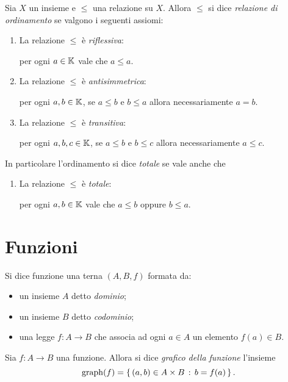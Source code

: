 \begin{definition}
    Sia $X$ un insieme e $\leq$ una relazione su $X$. Allora $\leq$ si dice \emph{relazione di ordinamento} se valgono i seguenti assiomi: \begin{enumerate}[label={(ORD\arabic*)}]
        \item La relazione $\leq$ è \emph{riflessiva}:
        
        per ogni $a \in \mathbb{K}$ vale che $a \leq a$.
        \item La relazione $\leq$ è \emph{antisimmetrica}:
        
        per ogni $a, b \in \mathbb{K}$, se $a \leq b$ e $b \leq a$ allora necessariamente $a = b$.
        \item La relazione $\leq$ è \emph{transitiva}:
        
        per ogni $a, b, c \in \mathbb{K}$, se $a \leq b$ e $b \leq c$ allora necessariamente $a \leq c$.
    \end{enumerate}

    In particolare l'ordinamento si dice \emph{totale} se vale anche che
    \begin{enumerate}[label={(O\arabic*)}, start=4]
        \item La relazione $\leq$ è \emph{totale}:
        
        per ogni $a, b \in \mathbb{K}$ vale che $a \leq b$ oppure $b \leq a$.
    \end{enumerate}
\end{definition}

\section{Funzioni}

\begin{definition}
    \label{def:funz_oper}
    Si dice funzione una terna $(A, B, f)$ formata da:
    \begin{itemize}
        \item un insieme $A$ detto \emph{dominio};
        \item un insieme $B$ detto \emph{codominio};
        \item una legge $f : A \to B$ che associa ad ogni $a \in A$ un elemento $f(a) \in B$.
    \end{itemize}
\end{definition}

\begin{definition}
     \label{def:graph}
    Sia $f : A \to B$ una funzione. Allora si dice \emph{grafico della funzione} l'insieme \[
        \operatorname{graph}(f) = \left\{\,(a, b) \in A \times B \,:\, b = f(a)\,\right\}.    
    \]
\end{definition}

